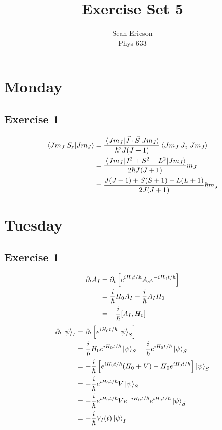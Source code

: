 \documentclass[12pt]{article}
\begin{document}
	
\title{Exercise Set 5}
\author{Sean Ericson \\ Phys 633}
\maketitle

\section*{Monday}
\subsection*{Exercise 1}
\begin{align*}
  \mel{J m_J}{S_z}{J m_J} &= \frac{\mel{J m_J}{\vec{J}\cdot\vec{S}}{J m_J}}{\hbar^2 J(J+1)}\mel{J m_J}{J_z}{J m_J} \\
  &= \frac{\mel{J m_J}{J^2 + S^2 - L^2}{J m_J}}{2\hbar J(J+1)}m_J \\
  &= \frac{J(J+1) + S(S+1) - L(L+1)}{2J(J+1)}\hbar m_J
\end{align*}


\section*{Tuesday}
\subsection*{Exercise 1}
\begin{align*}
  \partial_t A_I &= \partial_t \left[e^{iH_0t/\hbar}A_se^{-iH_0t/\hbar}\right] \\
  &= \frac{i}{\hbar}H_0A_I - \frac{i}{\hbar}A_IH_0 \\
  &= -\frac{i}{\hbar}\comm{A_I}{H_0}
\end{align*}
\begin{align*}
  \partial_t \ket{\psi}_I &= \partial_t \left[e^{iH_0t/\hbar}\ket{\psi}_S\right] \\
  &= \frac{i}{\hbar} H_0 e^{iH_0t/\hbar}\ket{\psi}_S - \frac{i}{\hbar}e^{iH_0t/\hbar}\ket{\psi}_S \\
  &= -\frac{i}{\hbar}\left[e^{iH_0t/\hbar}(H_0 + V) - H_0e^{iH_0t/\hbar}\right]\ket{\psi}_S \\
  &= -\frac{i}{\hbar}e^{iH_0t/\hbar}V\ket{\psi}_S \\
  &= -\frac{i}{\hbar}e^{iH_0t/\hbar}Ve^{-iH_0t/\hbar}e^{iH_0t/\hbar}\ket{\psi}_S \\
  &= -\frac{i}{\hbar}V_I(t)\ket{\psi}_I
\end{align*}
\end{document}
